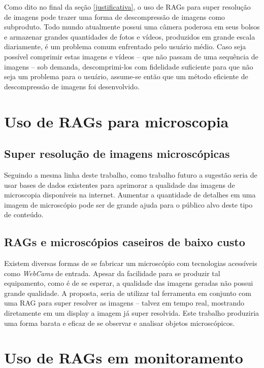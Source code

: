 Como dito no final da seção \ref{justificativa}, o uso de RAGs para super resolução de imagens pode trazer uma forma de descompressão de imagens como subproduto. Todo mundo atualmente possui uma câmera poderosa em seus bolsos e armazenar grandes quantidades de fotos e vídeos, produzidos em grande escala diariamente, é um problema comum enfrentado pelo usuário médio. Caso seja possível comprimir estas imagens e vídeos -- que não passam de uma sequência de imagens -- sob demanda, descomprimi-los com fidelidade suficiente para que não seja um problema para o usuário, assume-se então que um método eficiente de descompressão de imagens foi desenvolvido. 

\section{Uso de RAGs para microscopia}
\label{sec:trabalhos-futuros:microscopia}

\subsection{Super resolução de imagens microscópicas}
\label{sec:trabalhos-futuros:microscopia:imagens-existentes}

Seguindo a mesma linha deste trabalho, como trabalho futuro a sugestão seria de usar bases de dados existentes para aprimorar a qualidade das imagens de microscopia disponíveis na internet. Aumentar a quantidade de detalhes em uma imagem de microscópio pode ser de grande ajuda para o público alvo deste tipo de conteúdo. 

\subsection{RAGs e microscópios caseiros de baixo custo}
\label{sec:trabalhos-futuros:microscopia:baixo-custo}

Existem diversas formas de se fabricar um microscópio com tecnologias acessíveis como \textit{WebCams} de entrada. Apesar da facilidade para se produzir tal equipamento, como é de se esperar, a qualidade das imagens geradas não possui grande qualidade. A proposta, seria de utilizar tal ferramenta em conjunto com uma RAG para super resolver as imagens -- talvez em tempo real, mostrando diretamente em um display a imagem já super resolvida. Este trabalho produziria uma forma barata e eficaz de se observar e analisar objetos microscópicos. 

\section{Uso de RAGs em monitoramento}
\label{sec:trabalhos-futuros:monitoramento}

